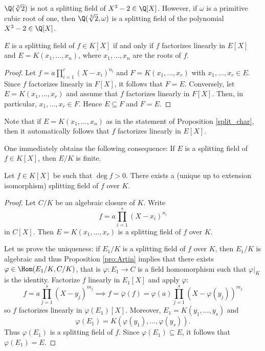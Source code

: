 \begin{example}
	$\Q(\sqrt[3]{2})$ is not a splitting field of $X^3-2\in\Q[X]$. However, if
	$\omega$ is a primitive cubic root of one, then 
	$\Q(\sqrt[3]{2},\omega)$ is a splitting field of the polynomial $X^3-2\in\Q[X]$. 
\end{example}

\begin{proposition} \label{split_char}
	$E$ is a splitting field of $f\in K[X]$ if and only if
	$f$ factorizes linearly in $E[X]$ and $E=K(x_1,\dots,x_n)$, where 
	$x_1,\dots,x_n$ are the roots of $f$. 
\end{proposition}

\begin{proof}
    Let $f=a\prod_{i=1}^r(X-x_i)^{n_i}$ and $F=K(x_1,\dots,x_r)$ with $x_1,\dots,x_r\in E$. Since $f$
    factorizes linearly in $F[X]$, it follows that $F=E$. 
    Conversely, let $E=K(x_1,\dots,x_r)$ and assume that $f$ factorizes linearly
    in $F[X]$. Then, in particular, $x_1,\dots,x_r\in F$. Hence $E\subseteq F$ and
    $F=E$. 
\end{proof}

Note that if $E=K(x_1,\ldots,x_n)$ as in the statement of Proposition \ref{split_char}, then it automatically follows that $f$ factorizes linearly in $E[X]$.

One immediately obtains the following consequence:
If $E$ is a splitting field of $f\in K[X]$, then $E/K$ is finite. 

\begin{theorem}
    Let $f\in K[X]$ be such that $\deg f>0$. There exists a (unique up to extension isomorphism) 
    splitting field of $f$ over $K$. 
\end{theorem}

\begin{proof}
    Let $C/K$ be an algebraic closure of $K$. Write 
    \[
    f=a\prod_{i=1}^r(X-x_i)^{n_i}
    \]
    in $C[X]$. 
    Then $E=K(x_1,\dots,x_r)$ is a splitting field of $f$ over $K$. 
    
    Let us prove the 
    uniqueness: if $E_1/K$ is a splitting field of $f$ over $K$, 
    then $E_1/K$ is algebraic and thus Proposition
    \ref{pro:Artin} implies that 
    there exists $\varphi\in\Hom(E_1/K,C/K)$, that is $\varphi\colon E_1\to C$ is a field
    homomorphism such that $\varphi|_K$ is the identity.
    Factorize $f$ linearly in $E_1[X]$ and apply $\overline{\varphi}$:
    \[
    f=a\prod_{j=1}^s(X-y_j)^{m_j}
    \implies
    f=\overline{\varphi}(f)=\varphi(a)\prod_{j=1}^s(X-\varphi(y_j))^{m_j}
    \]
    so $f$ factorizes linearly in $\varphi(E_1)[X]$. Moreover, 
    $E_1=K(y_1,\dots,y_s)$ and  
    \[
    \varphi(E_1)=K(\varphi(y_1),\dots,\varphi(y_s)).
    \]
    Thus
    $\varphi(E_1)$ is a splitting field of $f$. Since  
    $\varphi(E_1)\subseteq E$, it follows that $\varphi(E_1)=E$. 
\end{proof}

